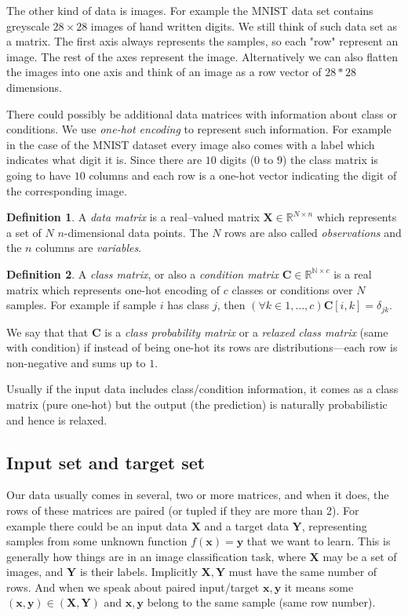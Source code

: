 \documentclass[11pt, a4paper]{report}
\theoremstyle{plain}
\theoremstyle{definition}
\newtheorem{mydef}{Definition}[chapter]
\theoremstyle{remark}
\newcommand{\N}{\mathbb{N}}
\newcommand{\R}{\mathbb{R}}
\newcommand{\X}{\mathbf{X}}
\newcommand{\x}{\mathbf{x}}
\newcommand{\Y}{\mathbf{Y}}
\newcommand{\y}{\mathbf{y}}
\newcommand{\bv}[1]{\boldsymbol{#1}}
\begin{document}
The other kind of data is images. For example the MNIST data set contains
greyscale $28 \times 28$ images of hand written digits. We still think of such
data set as a matrix. The first axis always represents the samples, so each
"row" represent an image. The rest of the axes represent the image.
Alternatively we can also flatten the images into one axis and think of an image
as a row vector of $28*28$ dimensions.

There could possibly be additional data matrices with information about class or
conditions. We use \emph{one-hot encoding} to represent such information. For
example in the case of the MNIST dataset every image also comes with a label
which indicates what digit it is. Since there are $10$ digits ($0$ to $9$) the
class matrix is going to have $10$ columns and each row is a one-hot vector
indicating the digit of the corresponding image.

\begin{mydef}
\label{def:datamatrix}
A \emph{data matrix} is a real--valued matrix $\bv{X} \in \R^{N \times n}$ which
represents a set of $N$ $n$-dimensional data points. The $N$ rows are also
called \emph{observations} and the $n$ columns are \emph{variables}.
\end{mydef}

\begin{mydef}
\label{def:classmatrix}
A \emph{class matrix}, or also a \emph{condition matrix} $\bv{C} \in \R^{\N
\times c}$ is a real matrix which represents one-hot encoding of $c$ classes or
conditions over $N$ samples. For example if sample $i$ has class $j$, then
$(\forall k\in 1, \dots, c) \bv{C}[i,k] = \delta_{jk}$.

We say that that $\bv{C}$ is a \emph{class probability matrix} or a
\emph{relaxed class matrix} (same with condition) if instead of being one-hot
its rows are distributions---each row is non-negative and sums up to $1$.
\end{mydef}

Usually if the input data includes class/condition information, it comes as a
class matrix (pure one-hot) but the output (the prediction) is naturally
probabilistic and hence is relaxed.

\subsection{Input set and target set}
Our data usually comes in several, two or more matrices,
and when it does, the rows of these matrices are paired (or tupled if they are
more than 2).
For example there could be an input data $\X$ and a target data $\Y$, representing 
samples from some unknown function $f(\x) = \y$ that we want to learn. 
This is generally how things are in an image classification task,
where $\X$ may be a set of images, and $\Y$ is
their labels. Implicitly $\X,\Y$ must have the same number of rows. And when we
speak about paired input/target $\x,\y$ it means some $(\x,\y) \in (\X,\Y)$ and
$\x,\y$ belong to the same sample (same row number).
\end{document}
